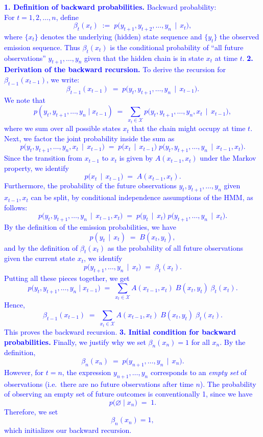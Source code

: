 \documentclass{article}
\begin{document}
\textcolor{blue}{\textbf{1. Definition of backward probabilities.}
Backward probability: \\ 
For $t = 1, 2, \ldots, n$, define
\[
\beta_t(x_t) 
\;:=\; 
p\bigl(y_{t+1}, y_{t+2}, \dots, y_n \,\mid\, x_t\bigr),
\]
where $\{x_t\}$ denotes the underlying (hidden) state sequence and $\{y_t\}$ the observed emission sequence. 
Thus $\beta_t(x_t)$ is the conditional probability of ``all future observations'' $y_{t+1},\dots,y_n$ given that the hidden chain is in state $x_t$ at time $t$.
\bigskip
\noindent
\textbf{2. Derivation of the backward recursion.}
\noindent
To derive the recursion for $\beta_{t-1}(x_{t-1})$, we write:
\[
\beta_{t-1}(x_{t-1}) 
\;=\; 
p\bigl(y_t, y_{t+1}, \dots, y_n \,\mid\, x_{t-1}\bigr).
\]
We note that
\[
p(y_t, y_{t+1}, \dots, y_n \mid x_{t-1})
\;=\;
\sum_{x_t \in \mathcal{X}}
p\bigl(y_t, y_{t+1}, \dots, y_n, x_t \,\mid\, x_{t-1}\bigr),
\]
where we sum over all possible states $x_t$ that the chain might occupy at time $t$. Next, we factor the joint probability inside the sum as
\[
p\bigl(y_t, y_{t+1}, \dots, y_n, x_t \,\mid\, x_{t-1}\bigr)
\;=\;
p\bigl(x_t \,\mid\, x_{t-1}\bigr)\; p\bigl(y_t, y_{t+1}, \dots, y_n \,\mid\, x_{t-1}, x_t\bigr).
\]
Since the transition from $x_{t-1}$ to $x_t$ is given by $A(x_{t-1}, x_t)$ under the Markov property, we identify
\[
p\bigl(x_t \,\mid\, x_{t-1}\bigr)
\;=\;
A(x_{t-1}, x_t).
\]
Furthermore, the probability of the future observations $y_t, y_{t+1}, \dots, y_n$ given $x_{t-1}, x_t$ can be split, by conditional independence assumptions of the HMM, as follows:
\[
p\bigl(y_t, y_{t+1}, \dots, y_n \,\mid\, x_{t-1}, x_t \bigr)
\;=\;
p\bigl(y_t \,\mid\, x_t \bigr)\;p\bigl(y_{t+1}, \dots, y_n \,\mid\, x_t \bigr).
\]
By the definition of the emission probabilities, we have
\[
p(y_t \,\mid\, x_t)
\;=\;
B(x_t, y_t),
\]
and by the definition of $\beta_t(x_t)$ as the probability of all future observations given the current state $x_t$, we identify
\[
p\bigl(y_{t+1}, \dots, y_n \,\mid\, x_t \bigr)
\;=\;
\beta_t(x_t).
\]
Putting all these pieces together, we get
\[
p\bigl(y_t, y_{t+1}, \dots, y_n \mid x_{t-1}\bigr)
\;=\;
\sum_{x_t \in \mathcal{X}} 
A(x_{t-1}, x_t)\;
B(x_t, y_t)\;
\beta_t(x_t).
\]
Hence,
\[
\beta_{t-1}(x_{t-1})
\;=\;
\sum_{x_t \in \mathcal{X}} 
A(x_{t-1}, x_t)\;
B(x_t, y_t)\;
\beta_t(x_t).
\]
This proves the backward recursion.
\bigskip
\noindent
\textbf{3. Initial condition for backward probabilities.}
\noindent
Finally, we justify why we set $\beta_n(x_n) = 1$ for all $x_n$. By the definition, 
\[
\beta_n(x_n)
\;=\;
p\bigl(y_{n+1}, \dots, y_n \,\mid\, x_n\bigr).
\]
However, for $t=n$, the expression $y_{n+1}, \dots, y_n$ corresponds to an \emph{empty set} of observations (i.e.\ there are no future observations after time $n$). The probability of observing an empty set of future outcomes is conventionally 1, since we have
\[
p\bigl(\varnothing \mid x_n\bigr)
\;=\;
1.
\]
Therefore, we set 
\[
\beta_n(x_n) = 1,
\]
which initializes our backward recursion.}

\bigskip
\end{document}
